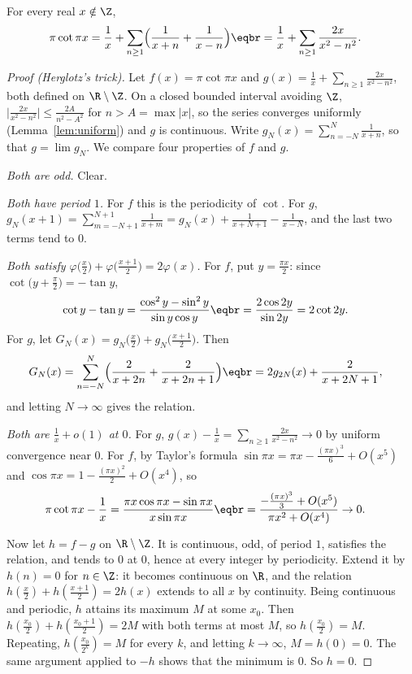 \begin{theorem}[Euler]\label{thm:cot}
For every real $x\notin\Z$,
\[
\begin{aligned}\pi\cot\pi x&=\frac1x+\sum_{n\ge1}\Bigl(\frac1{x+n}+\frac1{x-n}\Bigr)\eqbr=\frac1x+\sum_{n\ge1}\frac{2x}{x^2-n^2}.\end{aligned}
\]
\end{theorem}
\begin{proof}[Proof (Herglotz's trick)]
Let $f(x)=\pi\cot\pi x$ and $g(x)=\frac1x+\sum_{n\ge1}\frac{2x}{x^2-n^2}$, both defined on $\R\setminus\Z$. On a closed
bounded interval avoiding $\Z$, $\bigl|\frac{2x}{x^2-n^2}\bigr|\le\frac{2A}{n^2-A^2}$ for $n>A=\max|x|$, so the series converges
uniformly (Lemma~\ref{lem:uniform}) and $g$ is continuous. Write $g_N(x)=\sum_{n=-N}^N\frac1{x+n}$, so that $g=\lim g_N$. We compare four
properties of $f$ and $g$.

\emph{Both are odd.} Clear.

\emph{Both have period $1$.} For $f$ this is the periodicity of $\cot$. For $g$, $g_N(x+1)=\sum_{m=-N+1}^{N+1}\frac1{x+m}=g_N(x)+\frac1{x+N+1}-\frac1{x-N}$,
and the last two terms tend to $0$.

\emph{Both satisfy $\varphi\bigl(\frac x2\bigr)+\varphi\bigl(\frac{x+1}2\bigr)=2\varphi(x)$.} For $f$, put $y=\frac{\pi x}2$: since
$\cot\bigl(y+\frac\pi2\bigr)=-\tan y$,
\[
\begin{aligned}\cot y-\tan y&=\frac{\cos^2y-\sin^2y}{\sin y\cos y}\eqbr=\frac{2\cos2y}{\sin2y}=2\cot2y.\end{aligned}
\]
For $g$, let $G_N(x)=g_N\bigl(\frac x2\bigr)+g_N\bigl(\frac{x+1}2\bigr)$. Then
\[
\begin{aligned}G_N(x)&=\sum_{n=-N}^N\Bigl(\frac2{x+2n}+\frac2{x+2n+1}\Bigr)\eqbr=2g_{2N}(x)+\frac2{x+2N+1},\end{aligned}
\]
and letting $N\to\infty$ gives the relation.

\emph{Both are $\frac1x+o(1)$ at $0$.} For $g$, $g(x)-\frac1x=\sum_{n\ge1}\frac{2x}{x^2-n^2}\to0$ by uniform convergence near $0$.
For $f$, by Taylor's formula $\sin\pi x=\pi x-\frac{(\pi x)^3}6+O(x^5)$ and $\cos\pi x=1-\frac{(\pi x)^2}2+O(x^4)$, so
\[
\begin{aligned}\pi\cot\pi x-\frac1x&=\frac{\pi x\cos\pi x-\sin\pi x}{x\sin\pi x}\eqbr=\frac{-\frac{(\pi x)^3}3+O(x^5)}{\pi x^2+O(x^4)}\to0.\end{aligned}
\]

Now let $h=f-g$ on $\R\setminus\Z$. It is continuous, odd, of period $1$, satisfies the relation, and tends to $0$ at $0$,
hence at every integer by periodicity. Extend it by $h(n)=0$ for $n\in\Z$: it becomes continuous on $\R$, and the relation
$h(\frac x2)+h(\frac{x+1}2)=2h(x)$ extends to all $x$ by continuity. Being continuous and periodic, $h$ attains its maximum
$M$ at some $x_0$. Then $h(\frac{x_0}2)+h(\frac{x_0+1}2)=2M$ with both terms at most $M$, so $h(\frac{x_0}2)=M$. Repeating,
$h(\frac{x_0}{2^k})=M$ for every $k$, and letting $k\to\infty$, $M=h(0)=0$. The same argument applied to $-h$ shows that
the minimum is $0$. So $h=0$.
\end{proof}

